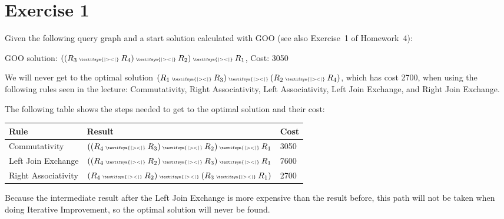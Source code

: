 \documentclass{scrartcl}
\newcommand{\join}{\mathbin{\text{\begin{tiny}\textifsym{|><|}\end{tiny}}}}
\begin{document}
\section*{Exercise 1}

Given the following query graph and a start solution calculated with GOO (see
also Exercise~1 of Homework~4):


GOO solution: $((R_3 \join R_4) \join R_2) \join R_1$, Cost: 3050

We will never get to the optimal solution $(R_1 \join R_3) \join (R_2 \join
R_4)$, which has cost 2700, when using the following rules seen in the lecture:
Commutativity, Right Associativity, Left Associativity, Left Join Exchange, and
Right Join Exchange.

The following table shows the steps needed to get to the optimal solution and
their cost:

\begin{table}[h]
    \centering
    \begin{tabular}{l|l|l}
        Rule & Result & Cost \\ \hline
        Commutativity & $((R_4 \join R_3) \join R_2) \join R_1$ & 3050 \\
        Left Join Exchange & $((R_4 \join R_2) \join R_3) \join R_1$ & 7600 \\
        Right Associativity & $(R_4 \join R_2) \join (R_3 \join R_1)$ & 2700
    \end{tabular}
\end{table}

Because the intermediate result after the Left Join Exchange is more expensive
than the result before, this path will not be taken when doing Iterative
Improvement, so the optimal solution will never be found.
\end{document}
